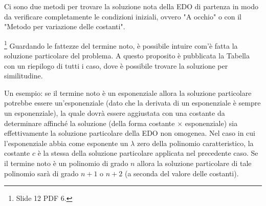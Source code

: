 Ci sono due metodi per trovare la soluzione nota della EDO di partenza in modo da verificare completamente le condizioni iniziali, ovvero "A occhio" o con il "Metodo per variazione delle costanti".

\label{ssec:metodo_somiglianza}
\footnote{Slide 12 PDF 6.}
Guardando le fattezze del termine noto, è possibile intuire com'è fatta la soluzione particolare del problema. A questo proposito è pubblicata la Tabella con un riepilogo di tutti i caso, dove è possibile trovare la soluzione per similitudine.

\noindent Un esempio: se il termine noto è un esponenziale allora la soluzione particolare potrebbe essere un'esponenziale (dato che la derivata di un esponenziale è sempre un esponenziale), la quale dovrà essere aggiustata con una costante da determinare affinché la soluzione (della forma costante $\times$ esponenziale) sia effettivamente la soluzione particolare della EDO non omogenea. Nel caso in cui l'esponenziale abbia come esponente un $\lambda$ zero della polinomio caratteristico, la costante $c$ è la stessa della soluzione particolare applicata nel precedente caso. Se il termine noto è un polinomio di grado $n$ allora la soluzione particolare di tale polinomio sarà di grado $n+1$ o $n+2$ (a seconda del valore delle costanti).

